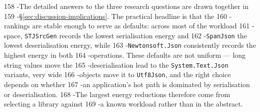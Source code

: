       158 -The detailed answers to the three research questions are drawn together in                                                                                                                       
      159 -\S\ref{sec:discussion-implications}. The practical headline is that the                                                                                                                          
      160 -rankings are stable enough to serve as defaults: across most of the workload                                                                                                                     
      161 -space, \texttt{STJSrcGen} records the lowest serialisation energy and                                                                                                                            
      162 -\texttt{SpanJson} the lowest deserialisation energy, while                                                                                                                                       
      163 -\texttt{Newtonsoft.Json} consistently records the highest energy in both                                                                                                                         
      164 -operations. These defaults are not uniform --- long string values move the                                                                                                                       
      165 -deserialisation lead to the \texttt{System.Text.Json} variants, very wide                                                                                                                        
      166 -objects move it to \texttt{Utf8Json}, and the right choice depends on whether                                                                                                                    
      167 -an application's hot path is dominated by serialisation or deserialisation.                                                                                                                      
      168 -The largest energy reductions therefore come from selecting a library against                                                                                                                    
      169 -a known workload rather than in the abstract. 

